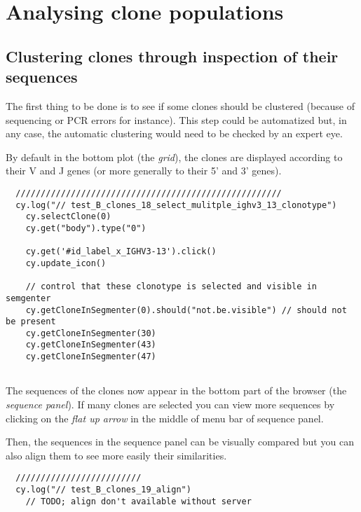 \section{Analysing clone populations}

\subsection{Clustering clones through inspection of their sequences}

The first thing to be done is to see if some clones should be clustered (because
of sequencing or PCR errors for instance). This step could be automatized
but, in any case, the automatic clustering would need to be checked by an expert
eye.

By default in the bottom plot (the \textit{grid}), the clones
  are displayed according to their V and J genes (or more generally to their
  5' and 3' genes). 

\begin{verbatim}
  /////////////////////////////////////////////////////
  cy.log("// test_B_clones_18_select_mulitple_ighv3_13_clonotype")
    cy.selectClone(0)
    cy.get("body").type("0")

    cy.get('#id_label_x_IGHV3-13').click()
    cy.update_icon()

    // control that these clonotype is selected and visible in semgenter
    cy.getCloneInSegmenter(0).should("not.be.visible") // should not be present
    cy.getCloneInSegmenter(30)
    cy.getCloneInSegmenter(43)
    cy.getCloneInSegmenter(47)


\end{verbatim}

The sequences of the clones now appear in the bottom part of the browser (the
\textit{sequence panel}). If many clones are selected you can view more sequences
by clicking on the \textit{flat up arrow} in the middle of menu bar of sequence panel.
 
Then, the sequences in the sequence panel can be visually compared but you can also align
them to see more easily their similarities.


\begin{verbatim}
  /////////////////////////
  cy.log("// test_B_clones_19_align")
    // TODO; align don't available without server


\end{verbatim}

